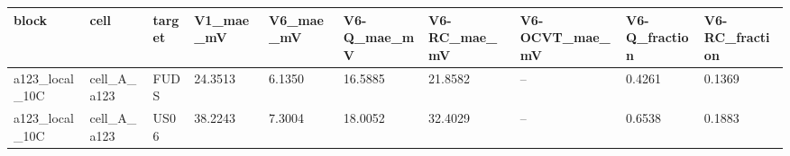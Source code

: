 \begin{tabular}{llllllllll}
\hline
block & cell & target & V1\_mae\_mV & V6\_mae\_mV & V6-Q\_mae\_mV & V6-RC\_mae\_mV & V6-OCVT\_mae\_mV & V6-Q\_fraction & V6-RC\_fraction \\
\hline
a123\_local\_10C & cell\_A\_a123 & FUDS & 24.3513 & 6.1350 & 16.5885 & 21.8582 & -- & 0.4261 & 0.1369 \\
a123\_local\_10C & cell\_A\_a123 & US06 & 38.2243 & 7.3004 & 18.0052 & 32.4029 & -- & 0.6538 & 0.1883 \\
\hline
\end{tabular}
